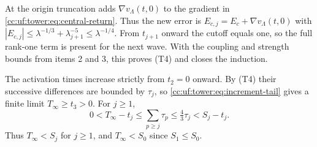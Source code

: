 \begin{enumerate}[leftmargin=*]
At the origin truncation adds $\nabla v_\Lambda(t,0)$ to the gradient
in \eqref{cc:uf:tower:eq:central-return}. Thus the new error is
$E_{c,j}=E_c+\nabla v_\Lambda(t,0)$ with
$|E_{c,j}|\le\lambda^{-1/3}+\lambda_{j+1}^{-5}\le\lambda^{-1/4}$.
From $t_{j+1}$ onward the cutoff equals one, so the full rank-one
term is present for the next wave. With the coupling and strength bounds
from items 2 and 3, this proves (T4) and closes the induction.
\end{enumerate}

The activation times increase strictly from $t_2=0$ onward. By (T4)
their successive differences are bounded by $\tau_j$, so
\eqref{cc:uf:tower:eq:increment-tail} gives a finite limit
$T_\infty\ge t_3>0$. For $j\ge1$,
\[
 0<T_\infty-t_j\le\sum_{p\ge j}\tau_p\le\tfrac43\tau_j<S_j-t_j .
\]
Thus $T_\infty<S_j$ for $j\ge1$, and $T_\infty<S_0$ since $S_1\le S_0$.
